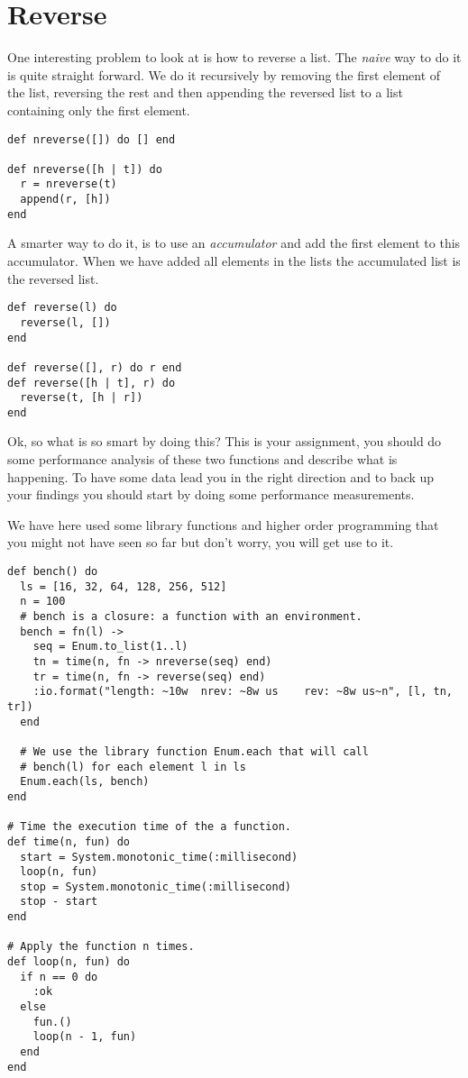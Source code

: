 \documentclass[a4paper,11pt]{article}
\begin{document}
\section{Reverse}

One interesting problem to look at is how to reverse a list. The {\em
  naive} way to do it is quite straight forward. We do it recursively
by removing the first element of the list, reversing the rest and then
appending the reversed list to a list containing only the first element.

\begin{verbatim}
def nreverse([]) do [] end

def nreverse([h | t]) do
  r = nreverse(t)
  append(r, [h])
end
\end{verbatim}

A smarter way to do it, is to use an {\em accumulator} and add the
first element to this accumulator. When we have added all elements in
the lists the accumulated list is the reversed list.

\begin{verbatim}
def reverse(l) do
  reverse(l, [])
end

def reverse([], r) do r end
def reverse([h | t], r) do
  reverse(t, [h | r])
end
\end{verbatim}

Ok, so what is so smart by doing this? This is your assignment, you
should do some performance analysis of these two functions and
describe what is happening. To have some data lead you in the right
direction and to back up your findings you should start by doing some
performance measurements.

We have here used some library functions and higher order programming
that you might not have seen so far but don't worry, you will get use
to it.

\begin{verbatim}
def bench() do
  ls = [16, 32, 64, 128, 256, 512]
  n = 100
  # bench is a closure: a function with an environment.
  bench = fn(l) ->
    seq = Enum.to_list(1..l)
    tn = time(n, fn -> nreverse(seq) end)
    tr = time(n, fn -> reverse(seq) end)
    :io.format("length: ~10w  nrev: ~8w us    rev: ~8w us~n", [l, tn, tr])
  end

  # We use the library function Enum.each that will call
  # bench(l) for each element l in ls
  Enum.each(ls, bench)
end

# Time the execution time of the a function.
def time(n, fun) do
  start = System.monotonic_time(:millisecond)
  loop(n, fun)
  stop = System.monotonic_time(:millisecond)
  stop - start
end

# Apply the function n times.
def loop(n, fun) do
  if n == 0 do
    :ok
  else
    fun.()
    loop(n - 1, fun)
  end
end
\end{verbatim}
\end{document}

